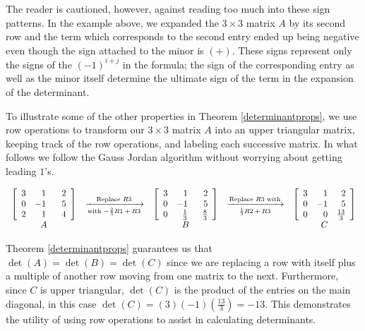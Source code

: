 \documentclass{ximera}
\begin{document}
The reader is cautioned, however, against reading too much into these sign patterns.  In the example above, we expanded the $3 \times 3$ matrix $A$ by its second row and the term which corresponds to the second entry ended up being negative even though the sign attached to the minor is $(+)$.  These signs represent only the signs of the $(-1)^{i+j}$ in the formula;  the sign of the corresponding entry as well as the minor itself determine the ultimate sign of the term in the expansion of the determinant.

\smallskip

To illustrate some of the other properties in  Theorem \ref{determinantprops}, we use row operations to transform our $3 \times 3$ matrix $A$ into an upper triangular matrix, keeping track of the row operations, and labeling each successive matrix.  In what follows we follow the Gauss Jordan algorithm without worrying about getting leading $1$'s.


\[ \begin{array}{ccccc}

\left[ \begin{array}{rrr} 
3 &  1 & \hphantom{-}2 \\ 
0 & -1 & 5 \\ 
2 & 1 & 4 \\ 
\end{array} \right]

&
\xrightarrow[\text{with $-\frac{2}{3}R1+R3$}]{\text{Replace $R3$}}
&

\left[ \begin{array}{rrr} 
3 &  1 & \hphantom{-}2 \\ 
0 & -1 & 5 \\
0 & \frac{1}{3} & \frac{8}{3} \\ 
\end{array} \right]
&
\xrightarrow[\text{$\frac{1}{3}R2+R3$}]{\text{Replace $R3$ with}}
&

\left[ \begin{array}{rrr} 
3 &  1 & 2 \\ 
0 & -1 & 5 \\
0 & 0 & \frac{13}{3} \\ 
\end{array} \right] \\

A & & B & & C \\

\end{array}\]

Theorem \ref{determinantprops} guarantees us that $\det(A) = \det(B) = \det(C)$ since we are replacing a row with itself plus a multiple of another row moving from one matrix to the next.  Furthermore, since $C$ is upper triangular, $\det(C)$ is the product of the entries on the main diagonal, in this case  $\det(C) = (3)(-1)\left(\frac{13}{3}\right) = -13$.  This demonstrates the utility of using row operations to assist in calculating determinants.  
\end{document}
